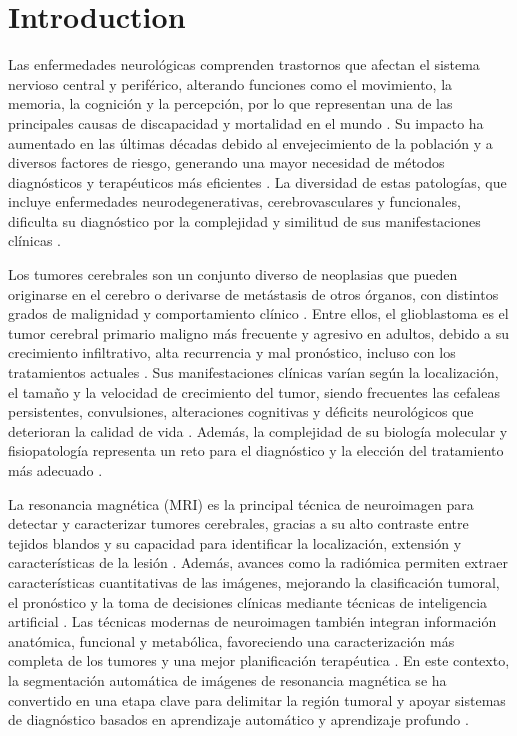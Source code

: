\section{Introduction}
\label{sec:introduction}
Las enfermedades neurológicas comprenden trastornos que afectan el sistema nervioso central y periférico, alterando funciones como el movimiento, la memoria, la cognición y la percepción, por lo que representan una de las principales causas de discapacidad y mortalidad en el mundo \cite{Ding2022}. Su impacto ha aumentado en las últimas décadas debido al envejecimiento de la población y a diversos factores de riesgo, generando una mayor necesidad de métodos diagnósticos y terapéuticos más eficientes \cite{Ding2022}. La diversidad de estas patologías, que incluye enfermedades neurodegenerativas, cerebrovasculares y funcionales, dificulta su diagnóstico por la complejidad y similitud de sus manifestaciones clínicas \cite{Mavroudis2024} \cite{Finkelstein2025}. 

Los tumores cerebrales son un conjunto diverso de neoplasias que pueden originarse en el cerebro o derivarse de metástasis de otros órganos, con distintos grados de malignidad y comportamiento clínico \cite{Pichaivel2022}. Entre ellos, el glioblastoma es el tumor cerebral primario maligno más frecuente y agresivo en adultos, debido a su crecimiento infiltrativo, alta recurrencia y mal pronóstico, incluso con los tratamientos actuales \cite{Schaff2023}. Sus manifestaciones clínicas varían según la localización, el tamaño y la velocidad de crecimiento del tumor, siendo frecuentes las cefaleas persistentes, convulsiones, alteraciones cognitivas y déficits neurológicos que deterioran la calidad de vida \cite{Barkade2023} \cite{Essianda2023}. Además, la complejidad de su biología molecular y fisiopatología representa un reto para el diagnóstico y la elección del tratamiento más adecuado \cite{Essianda2023}.

La resonancia magnética (MRI) es la principal técnica de neuroimagen para detectar y caracterizar tumores cerebrales, gracias a su alto contraste entre tejidos blandos y su capacidad para identificar la localización, extensión y características de la lesión \cite{Martucci2023}. Además, avances como la radiómica permiten extraer características cuantitativas de las imágenes, mejorando la clasificación tumoral, el pronóstico y la toma de decisiones clínicas mediante técnicas de inteligencia artificial \cite{Wang2025}. Las técnicas modernas de neuroimagen también integran información anatómica, funcional y metabólica, favoreciendo una caracterización más completa de los tumores y una mejor planificación terapéutica \cite{Nikam2022}. En este contexto, la segmentación automática de imágenes de resonancia magnética se ha convertido en una etapa clave para delimitar la región tumoral y apoyar sistemas de diagnóstico basados en aprendizaje automático y aprendizaje profundo \cite{Mohammed2023}.

